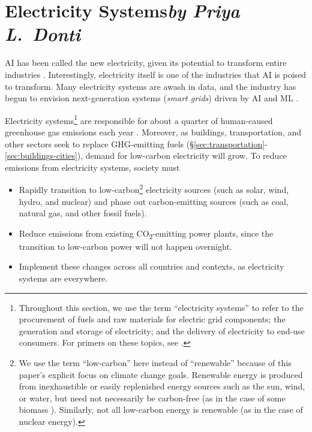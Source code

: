\documentclass[11pt]{report}
\newcommand{\carbon}{\texorpdfstring{CO\textsubscript{2}}{CO2}}
\begin{document}
\section{Electricity Systems\texorpdfstring{\hfill\textit{by Priya L.~Donti}}{}}
\label{sec:electricity-systems}
AI has been called the new electricity, given its potential to transform entire industries \cite{youtube2017andrew}. Interestingly, electricity itself is one of the industries that AI is poised to transform. Many electricity systems are awash in data, and the industry has begun to envision next-generation systems (\emph{smart grids}) driven by AI and ML \cite{ramchurn2012putting, perera2014machine, victor2019how}.

Electricity systems\footnote{Throughout this section, we use the term ``electricity systems'' to refer to the procurement of fuels and raw materials for electric grid components; the generation and storage of electricity; and the delivery of electricity to end-use consumers. For primers on these topics, see \cite{ipcc2014energy,federal2015energy, von2006electric, kirschen2004fundamentals, wood2013power}.} are responsible for about a quarter of human-caused greenhouse gas emissions each year \cite{ipcc2014summary}. Moreover, as buildings, transportation, and other sectors seek to replace GHG-emitting fuels (\S\ref{sec:transportation}-\ref{sec:buildings-cities}), demand for low-carbon electricity will grow. To reduce emissions from electricity systems, society must
\begin{itemize}
    \item Rapidly transition to low-carbon\footnote{We use the term ``low-carbon'' here instead of ``renewable'' because of this paper's explicit focus on climate change goals. Renewable energy is produced from inexhaustible or easily replenished energy sources such as the sun, wind, or water, but need not necessarily be carbon-free (as in the case of some biomass \cite{creutzig2016economic}). Similarly, not all low-carbon energy is renewable (as in the case of nuclear energy).} electricity sources (such as solar, wind, hydro, and nuclear) and phase out carbon-emitting sources (such as coal, natural gas, and other fossil fuels).
    \item Reduce emissions from existing \carbon-emitting power plants, since the transition to low-carbon power will not happen overnight.
    \item Implement these changes across all countries and contexts, as electricity systems are everywhere.
\end{itemize}
\end{document}
